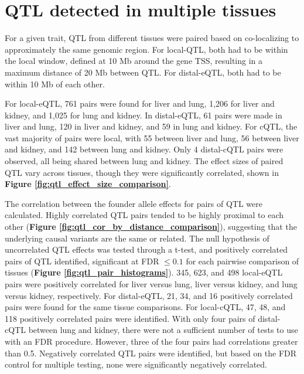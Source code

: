 \section{QTL detected in multiple tissues}

For a given trait, QTL from different tissues were paired based on co-localizing to approximately the same genomic region. For local-QTL, both had to be within the local window, defined at 10 Mb around the gene TSS, resulting in a maximum distance of 20 Mb between QTL. For distal-eQTL, both had to be within 10 Mb of each other. 

For local-eQTL, 761 pairs were found for liver and lung, 1,206 for liver and kidney, and 1,025 for lung and kidney. In distal-eQTL, 61 pairs were made in liver and lung, 120 in liver and kidney, and 59 in lung and kidney. For cQTL, the vast majority of pairs were local, with 55 between liver and lung, 56 between liver and kidney, and 142 between lung and kidney. Only 4 distal-cQTL pairs were observed, all being shared between lung and kidney. The effect sizes of paired QTL vary across tissues, though they were significantly correlated, shown in \textbf{Figure \ref{fig:qtl_effect_size_comparison}}.

The correlation between the founder allele effects for pairs of QTL were calculated. Highly correlated QTL pairs tended to be highly proximal to each other (\textbf{Figure \ref{fig:qtl_cor_by_distance_comparison}}), suggesting that the underlying causal variants are the same or related. The null hypothesis of uncorrelated QTL effects was tested through a t-test, and positively correlated pairs of QTL identified, significant at FDR $\leq 0.1$ for each pairwise comparison of tissues (\textbf{Figure \ref{fig:qtl_pair_histograms}}). 345, 623, and 498 local-eQTL pairs were positively correlated for liver versus lung, liver versus kidney, and lung versus kidney, respectively. For distal-eQTL, 21, 34, and 16 positively correlated pairs were found for the same tissue comparisons. For local-cQTL, 47, 48, and 118 positively correlated pairs were identified. With only four pairs of distal-cQTL between lung and kidney, there were not a sufficient number of tests to use with an FDR procedure. However, three of the four pairs had correlations greater than 0.5. Negatively correlated QTL pairs were identified, but based on the FDR control for multiple testing, none were significantly negatively correlated.

